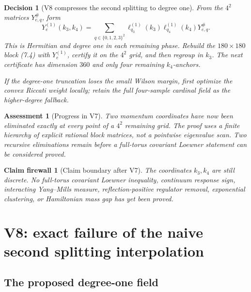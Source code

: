 \documentclass[11pt,oneside]{article}
\newtheorem{assessment}[theorem]{Assessment}
\newtheorem{firewall}[theorem]{Claim firewall}
\newtheorem{decision}[theorem]{Decision}
\theoremstyle{definition}
\theoremstyle{remark}
\begin{document}
\begin{decision}[V8 compresses the second splitting to degree one]
\label{dec:newv7-next}
From the \(4^2\) matrices \(Y_{e,q}^\#\), form
\[
 Y_e^{(1)}(k_3,k_4)
 =\sum_{q\in\{0,1,2,3\}^2}
 \ell_{q_3}^{(1)}(k_3)\ell_{q_4}^{(1)}(k_4)Y_{e,q}^\#.
                                                               \tag{7.12}
\]
This is Hermitian and degree one in each remaining phase.  Rebuild
the \(180\times180\) block (7.4) with \(Y_e^{(1)}\), certify it on
the \(4^2\) grid, and then regroup in \(k_3\).  The next certificate
has dimension \(360\) and only four remaining \(k_4\)-anchors.

If the degree-one truncation loses the small Wilson margin, first
optimize the convex Riccati weight locally; retain the full
four-sample cardinal field as the higher-degree fallback.
\end{decision}

\begin{assessment}[Progress in V7]
\label{ass:newv7-progress}
Two momentum coordinates have now been eliminated exactly at every
point of a \(4^2\) remaining grid.  The proof uses a finite hierarchy
of explicit rational block matrices, not a pointwise eigenvalue
scan.  Two recursive eliminations remain before a full-torus
covariant Loewner statement can be considered proved.
\end{assessment}

\begin{firewall}[Claim boundary after V7]
\label{fire:newv7-final}
The coordinates \(k_3,k_4\) are still discrete.  No full-torus
covariant Loewner inequality, continuum response sign, interacting
Yang--Mills measure, reflection-positive regulator removal,
exponential clustering, or Hamiltonian mass gap has yet been proved.
\end{firewall}

\section{V8: exact failure of the naive second splitting interpolation}
\label{sec:newv8-no-go}

\subsection{The proposed degree-one field}
\end{document}
